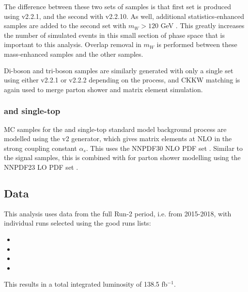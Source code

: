 The difference between these two sets of samples is that first set is produced using \sherpa v2.2.1, and the second with \sherpa v2.2.10. As well, additional statistics-enhanced \wjets samples are added to the second set with $m_W > 120$ GeV \cite{VJets_mW}. This greatly increases the number of simulated events in this small section of phase space that is important to this analysis. Overlap removal in $m_W$ is performed between these mass-enhanced samples and the other \wjets samples.

Di-boson and tri-boson samples are similarly generated with only a single set using either \sherpa v2.2.1 or v2.2.2 depending on the process, and CKKW matching is again used to merge parton shower and matrix element simulation.

\subsubsection{\ttbar and single-top}
MC samples for the \ttbar and single-top standard model background process are modelled using the \powhegbox v2 \cite{Powheg} generator, which gives matrix elements at NLO in the strong coupling constant $\alpha_s$. This uses the NNPDF30 NLO PDF set \cite{PDF30}. Similar to the signal samples, this is combined with  \cite{Pythia} for parton shower modelling using the NNPDF23 LO PDF set \cite{PDF23}.

\subsection{Data}
This analysis uses data from the full Run-2 period, i.e. from 2015-2018, with individual runs selected using the good runs lists:
{ \scriptsize
\begin{itemize}
	\item \GRLa
	\item \GRLb
	\item \GRLc
	\item \GRLd
\end{itemize}
}
This results in a total integrated luminosity of 138.5 fb$^{-1}$.

